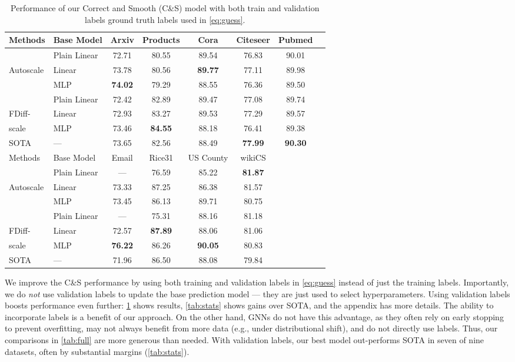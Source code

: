 \documentclass{article}
\newcommand{\framework}{C\&S}
\begin{document}
\begin{table}[!t]
\centering
\caption{Performance of our Correct and Smooth (\framework{}) model with both train and validation labels
ground truth labels used in \cref{eq:guess}.}\label{tab:full_all}
 \vspace{-\baselineskip}
\begin{center}
\begin{tabular}{llcccccc}
\toprule
Methods &  Base Model  & Arxiv & Products  & Cora & Citeseer & Pubmed \\ 
\midrule
& Plain Linear&	 72.71  & 80.55 & 89.54 & 76.83 & 90.01 \\
 Autoscale & Linear	& 73.78 & 80.56 & \textbf{89.77} & 77.11 & 89.98 \\
& MLP & \textbf{74.02}   & 79.29 & 88.55 & 76.36 & 89.50 \\
\midrule
& Plain Linear& 72.42   &  82.89 & 89.47 & 77.08 & 89.74 \\
 FDiff-  & Linear&  72.93   &  83.27 & 89.53 & 77.29 & 89.57\\
scale& MLP&   73.46  & \textbf{84.55} & 88.18 & 76.41 & 89.38 \\
\midrule
 SOTA  & --- & 73.65  & 82.56 & 88.49 & \textbf{77.99} & \textbf{90.30} \\
\midrule
Methods &  Base Model  & Email & Rice31 &  US County & wikiCS\\ 
\midrule
& Plain Linear&	---&  76.59 	 & 85.22 	& \textbf{81.87}\\
 Autoscale & Linear	  & 73.33  & 87.25  & 86.38  & 81.57  \\
& MLP   &  73.45  & 86.13  & 89.71 	& 80.75 \\
\midrule
& Plain Linear  &	---& 75.31 	& 88.16 	& 81.18\\
 FDiff-  &  Linear  & 72.57  & \textbf{87.89}  & 88.06 	& 81.06 \\
scale& MLP  &  \textbf{76.22}  & 86.26  & \textbf{90.05} 	& 80.83 \\
\midrule
 SOTA & --- & 71.96  & 86.50  & 88.08  & 79.84  \\
\bottomrule
\end{tabular}
\end{center}
\end{table}


We improve the \framework{} performance by using both training
and validation labels in \cref{eq:guess} instead of just the training labels. 
Importantly, we do \emph{not} use validation labels to update the base prediction model --- they are just used to select hyperparameters.
Using validation labels boosts performance even further:
\cref{tab:full_all} shows results,
\cref{tab:stats} shows gains over SOTA,
and the appendix has more details.
The ability to incorporate labels is a benefit of our approach.
On the other hand, GNNs do not have this advantage, as they 
often rely on early stopping to prevent overfitting,
may not always benefit from more data (e.g., under distributional shift),
and do not directly use labels.
Thus, our comparisons in \cref{tab:full} are more generous than needed.
With validation labels, our best model out-performs SOTA in seven of nine datasets,
often by substantial margins (\cref{tab:stats}).
\end{document}
